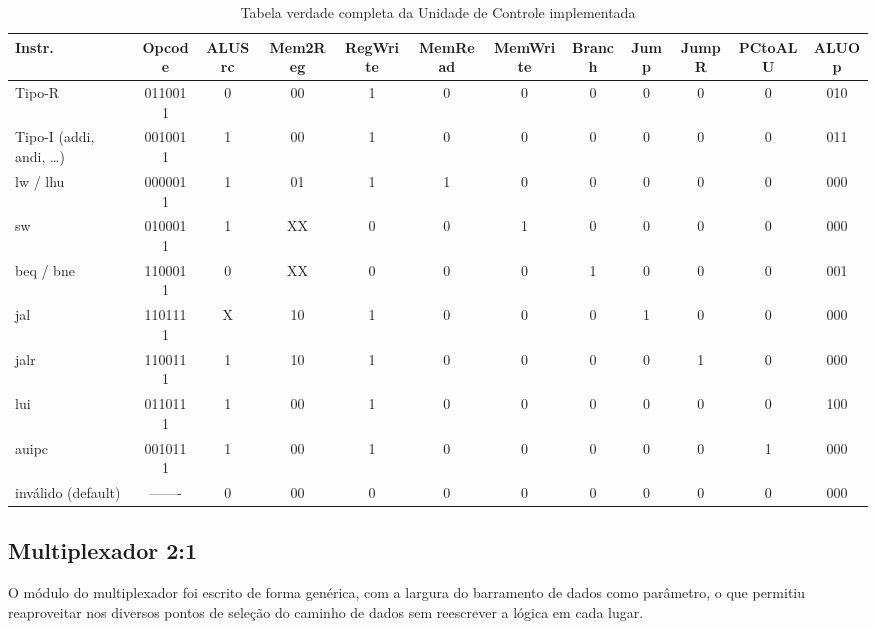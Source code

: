 \documentclass[conference]{IEEEtran}
\begin{document}
\begin{table}[!t]
\caption{Tabela verdade completa da Unidade de Controle implementada}
\begin{center}
\scriptsize
\setlength{\tabcolsep}{4pt}
\begin{tabular}{l|c|c|c|c|c|c|c|c|c|c|c}
\hline \hline
\textbf{Instr.} & \textbf{Opcode} & \textbf{ALUSrc} & \textbf{Mem2Reg} & \textbf{RegWrite} & \textbf{MemRead} & \textbf{MemWrite} & \textbf{Branch} & \textbf{Jump} & \textbf{JumpR} & \textbf{PCtoALU} & \textbf{ALUOp} \\
\hline
Tipo-R                  & 0110011 & 0 & 00 & 1 & 0 & 0 & 0 & 0 & 0 & 0 & 010 \\
Tipo-I (addi, andi, \ldots) & 0010011 & 1 & 00 & 1 & 0 & 0 & 0 & 0 & 0 & 0 & 011 \\
lw / lhu                & 0000011 & 1 & 01 & 1 & 1 & 0 & 0 & 0 & 0 & 0 & 000 \\
sw                      & 0100011 & 1 & XX & 0 & 0 & 1 & 0 & 0 & 0 & 0 & 000 \\
beq / bne               & 1100011 & 0 & XX & 0 & 0 & 0 & 1 & 0 & 0 & 0 & 001 \\
jal                     & 1101111 & X & 10 & 1 & 0 & 0 & 0 & 1 & 0 & 0 & 000 \\
jalr                    & 1100111 & 1 & 10 & 1 & 0 & 0 & 0 & 0 & 1 & 0 & 000 \\
lui                     & 0110111 & 1 & 00 & 1 & 0 & 0 & 0 & 0 & 0 & 0 & 100 \\
auipc                   & 0010111 & 1 & 00 & 1 & 0 & 0 & 0 & 0 & 0 & 1 & 000 \\
\hline
inválido (default)      & ------- & 0 & 00 & 0 & 0 & 0 & 0 & 0 & 0 & 0 & 000 \\
\hline \hline
\end{tabular}
\end{center}
\label{tab:controle_completo}
\end{table}

\subsection{Multiplexador 2:1}
O módulo do multiplexador foi escrito de forma genérica, com a largura do barramento de dados como
parâmetro, o que permitiu reaproveitar nos diversos pontos de seleção do caminho de dados sem reescrever a
lógica em cada lugar.
\end{document}
